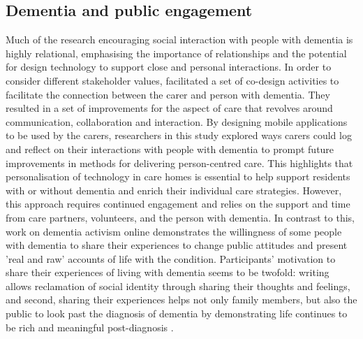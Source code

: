 \subsection{Dementia and public engagement}
\label{Related:PublicEngagement}
Much of the research encouraging social interaction with people with dementia is highly relational, emphasising the importance of relationships and the potential for design technology to support close and personal interactions. In order to consider different stakeholder values, \cite{maiden_computing_2013} facilitated a set of co-design activities to facilitate the connection between the carer and person with dementia. They resulted in a set of improvements for the aspect of care that revolves around communication, collaboration and interaction. By designing mobile applications to be used by the carers, researchers in this study explored ways carers could log and reflect on their interactions with people with dementia to prompt future improvements in methods for delivering person-centred care. This highlights that personalisation of technology in care homes is essential to help support residents with or without dementia and enrich their individual care strategies. However, this approach requires continued engagement and relies on the support and time from care partners, volunteers, and the person with dementia. In contrast to this, \cite{lazar_safe_2019} work on dementia activism online demonstrates the willingness of some people with dementia to share their experiences to change public attitudes and present 'real and raw' accounts of life with the condition. Participants' motivation to share their experiences of living with dementia seems to be twofold: writing allows reclamation of social identity through sharing their thoughts and feelings, and second, sharing their experiences helps not only family members, but also the public to look past the diagnosis of dementia by demonstrating life continues to be rich and meaningful post-diagnosis \citep{ryan_dementia_2009}. 

